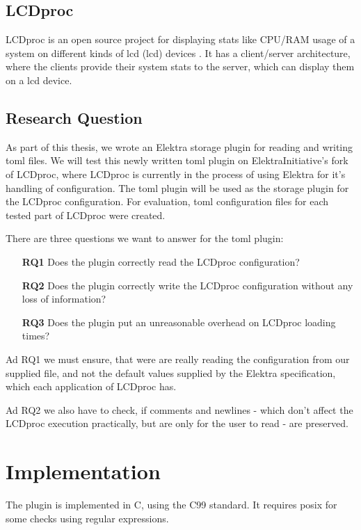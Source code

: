 \documentclass[12pt]{report}
\begin{document}
\section{LCDproc}
LCDproc is an open source project for displaying stats like CPU/RAM usage of a system on different kinds of \acrshort{lcd} (\acrlong{lcd}) devices \cite{LCDprocmain}\cite{LCDprocgit}.
It has a client/server architecture, where the clients provide their system stats to the server, which can display them on a \acrshort{lcd} device.

\section{Research Question}
As part of this thesis, we wrote an Elektra storage plugin for reading and writing \acrshort{toml} files.
We will test this newly written \acrshort{toml} plugin on ElektraInitiative's fork of LCDproc, where LCDproc is currently in the process of using Elektra for it's handling of configuration.
The \acrshort{toml} plugin will be used as the storage plugin for the LCDproc configuration.
For evaluation, \acrshort{toml} configuration files for each tested part of LCDproc were created.

There are three questions we want to answer for the \acrshort{toml} plugin:
\begin{itemize}
	\item[\textbf{RQ1}] Does the plugin correctly read the LCDproc configuration?
	\item[\textbf{RQ2}] Does the plugin correctly write the LCDproc configuration without any loss of information?
	\item[\textbf{RQ3}] Does the plugin put an unreasonable overhead on LCDproc loading times?
\end{itemize}
Ad RQ1 we must ensure, that were are really reading the configuration from our supplied file, and not the default values supplied by the Elektra specification, which each application of LCDproc has.

Ad RQ2 we also have to check, if comments and newlines - which don't affect the LCDproc execution practically, but are only for the user to read - are preserved.

\chapter{Implementation}

The plugin is implemented in C, using the C99 standard. It requires \acrshort{posix} for some checks using regular expressions.
\end{document}
